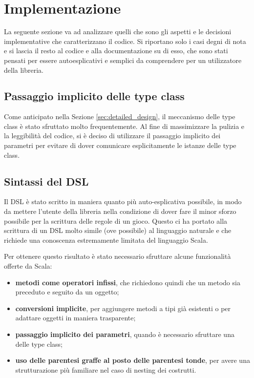 \section{Implementazione}

La seguente sezione va ad analizzare quelli che sono gli aspetti e le decisioni implementative che caratterizzano il codice.
%
Si riportano solo i casi degni di nota e si lascia il resto al codice e alla documentazione su di esso, che sono stati pensati per essere autoesplicativi e semplici da comprendere per un utilizzatore della libreria.


\subsection{Passaggio implicito delle type class}

Come anticipato nella Sezione \ref{sec:detailed_design}, il meccanismo delle type class è stato sfruttato molto frequentemente.
%
Al fine di massimizzare la pulizia e la leggibilità del codice, si è deciso di utilizzare il passaggio implicito dei parametri per evitare di dover comunicare esplicitamente le istanze delle type class.


\subsection{Sintassi del DSL}\label{sec:dsl_syntax}

Il DSL è stato scritto in maniera quanto più auto-esplicativa possibile, in modo da mettere l'utente della libreria nella condizione di dover fare il minor sforzo possibile per la scrittura delle regole di un gioco.
%
Questo ci ha portato alla scrittura di un DSL molto simile (ove possibile) al linguaggio naturale e che richiede una conoscenza estremamente limitata del linguaggio Scala.

Per ottenere questo risultato è stato necessario sfruttare alcune funzionalità offerte da Scala:
\begin{itemize}
  \item \textbf{metodi come operatori infissi}, che richiedono quindi che un metodo sia preceduto e seguito da un oggetto;
  \item \textbf{conversioni implicite}, per aggiungere metodi a tipi già esistenti o per adattare oggetti in maniera trasparente;
  \item \textbf{passaggio implicito dei parametri}, quando è necessario sfruttare una delle type class;
  \item \textbf{uso delle parentesi graffe al posto delle parentesi tonde}, per avere una strutturazione più familiare nel caso di nesting dei costrutti.
\end{itemize}

